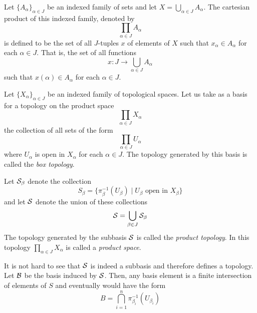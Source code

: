 \begin{definition}
    Let $\{A_\alpha\}_{\alpha\in J}$ be an indexed family of sets and let $X = \bigcup_{\alpha\in J}A_\alpha$. The cartesian product of this indexed family, denoted by 
    \begin{equation*}
        \prod_{\alpha\in J}A_\alpha
    \end{equation*}
    is defined to be the set of all $J$-tuples $x$ of elements of $X$ such that $x_\alpha\in A_\alpha$ for each $\alpha\in J$. That is, the set of all functions 
    \begin{equation*}
        x: J\to\bigcup_{\alpha\in J}A_\alpha
    \end{equation*}
    such that $x(\alpha)\in A_\alpha$ for each $\alpha\in J$.
\end{definition}

\begin{definition}
    Let $\{X_\alpha\}_{\alpha\in J}$ be an indexed family of topological spaces. Let us take as a basis for a topology on the product space 
    \begin{equation*}
        \prod_{\alpha\in J}X_\alpha
    \end{equation*}
    the collection of all sets of the form 
    \begin{equation*}
        \prod_{\alpha\in J}U_\alpha
    \end{equation*}
    where $U_\alpha$ is open in $X_\alpha$ for each $\alpha\in J$. The topology generated by this basis is called the \textit{box topology}.
\end{definition}

\begin{definition}
    Let $\S_\beta$ denote the collection 
    \begin{equation*}
        S_\beta = \{\pi_\beta^{-1}(U_\beta)\mid \text{$U_\beta$ open in $X_\beta$}\}
    \end{equation*}
    and let $\S$ denote the union of these collections 
    \begin{equation*}
        \S = \bigcup_{\beta\in J}\S_\beta
    \end{equation*}
    The topology generated by the subbasis $\S$ is called the \textit{product topology}. In this topology $\prod_{\alpha\in J}X_\alpha$ is called a \textit{product space}.
\end{definition}

It is not hard to see that $\S$ is indeed a subbasis and therefore defines a topology. Let $\B$ be the basis induced by $\S$. Then, any basis element is a finite intersection of elements of $S$ and eventually would have the form 
\begin{equation*}
    B = \bigcap_{i=1}^n\pi_{\beta_i}^{-1}(U_{\beta_i})
\end{equation*}

